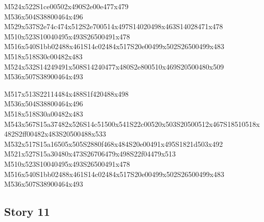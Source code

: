 \documentclass{article}
\begin{document}
\begin{multicols}{5}
\begin{center}
M524x522S1ce00502x490S2e00e477x479 %
\\M536x504S38800464x496 %
\\M529x537S2e74c474x512S2e700514x497S14020498x463S14028471x478 %
\\M510x523S10040495x493S26500491x478 %
\\M516x540S1bb02488x461S14c02484x517S20e00499x502S26500499x483 %
\\M518x518S30c00482x483 %
\\M524x532S14249491x508S14240477x480S2e800510x469S20500480x509 %
\\M536x507S38900464x493 %
\vfil
\columnbreak

M517x513S22114484x488S1f420488x498 %
\\M536x504S38800464x496 %
\\M518x518S30a00482x483 %
\\M543x567S15a37482x526S14c51500x541S22c00520x503S20500512x467S18510518x482S2ff00482x483S20500488x533 %
\\M532x517S15a16505x505S2880f468x484S20e00491x495S1821d503x492 %
\\M521x527S15a30480x473S26706479x498S22f04479x513 %
\\M510x523S10040495x493S26500491x478 %
\\M516x540S1bb02488x461S14c02484x517S20e00499x502S26500499x483 %
\\M536x507S38900464x493 %
\vfil

\end{center}
\end{multicols}

\subsection{Story 11}
\end{document}
